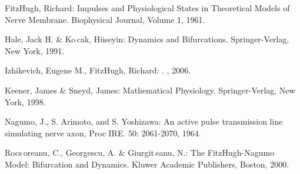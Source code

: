 \documentclass[12pt]{article}
\begin{document}
\begin{thebibliography}{20}

 FitzHugh, Richard: Impulses and Physiological States in Theoretical Models of Nerve Membrane. Biophysical Journal, Volume 1, 1961.

 Hale, Jack H. \& Ko\,cak, H\"useyin: Dynamics and Bifurcations.  Springer-Verlag, New York, 1991.

 Izhikevich, Eugene M., FitzHugh, Richard: . , 2006.

 Keener, James \& Sneyd, James: Mathematical Physiology.  Springer-Verlag, New York, 1998.

 Nagumo, J., S. Arimoto, and S. Yoshizawa:  An active pulse transmission line simulating nerve axon, Proc IRE. 50: 2061-2070, 1964.

 Rocs\,oreanu, C., Georgescu, A. \& Giurgit\,eanu, N.:  The FitzHugh-Nagumo Model: Bifurcation and Dynamics.  Kluwer Academic Publishers, Boston, 2000.

\end{thebibliography}

\end{document}

